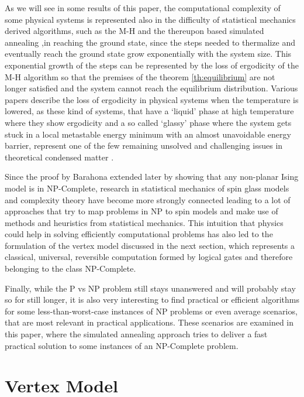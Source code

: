As we will see in some results of this paper, the computational complexity of some physical systems is represented also in the difficulty of statistical mechanics derived algorithms, such as the M-H and the thereupon based simulated annealing ,in reaching the ground state, since the steps needed to thermalize and eventually reach the ground state grow exponentially with the system size.
This exponential growth of the steps can be represented by the loss of ergodicity of the M-H algorithm so that the premises of the theorem \ref{th:equilibrium} are not longer satisfied and the system cannot reach the equilibrium distribution.
Various papers \cite{Mauro} \cite{Carleo} \cite{Mackenzie} describe the loss of ergodicity in physical systems when the temperature is lowered, as these kind of systems, that have a `liquid' phase at high temperature where they show ergodicity and a so called `glassy' phase where the system gets stuck in a local metastable energy minimum with an almost unavoidable energy barrier, represent one of the few remaining unsolved and challenging issues in theoretical condensed matter \cite{Complex_behavior_of_glassy_systems}.

Since the proof by Barahona \cite{Barahona} extended later by \cite{Istrail} showing that any non-planar Ising model is in NP-Complete, research in statistical mechanics of spin glass models and complexity theory have become more strongly connected leading to a lot of approaches that try to map problems in NP to spin models \cite{Lucas} and make use of methods and heuristics from statistical mechanics.
This intuition that physics could help in solving efficiently computational problems has also led to the formulation of the vertex model discussed in the next section, which represents a classical, universal, reversible computation formed by logical gates and therefore belonging to the class NP-Complete.

Finally, while the P vs NP problem still stays unanswered and will probably stay so for still longer, it is also very interesting to find practical or efficient algorithms for some less-than-worst-case instances of NP problems or even average scenarios, that are most relevant in practical applications. These scenarios are examined in this paper, where the simulated annealing approach tries to deliver a fast practical solution to some instances of an NP-Complete problem.


\section{Vertex Model \label{sec:VM}}

